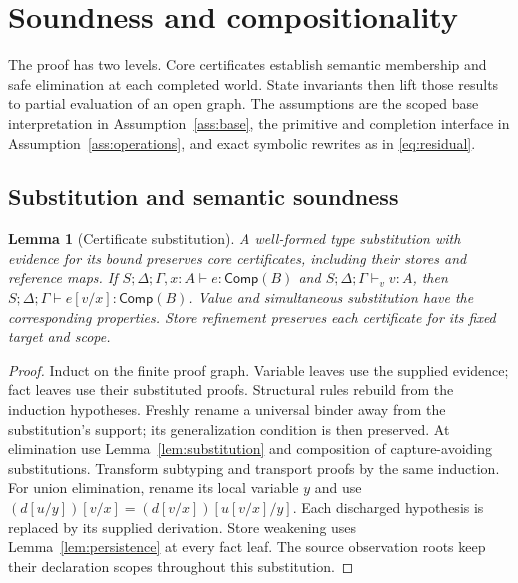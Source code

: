 \documentclass[10pt,a4paper]{article}
\newcommand{\Comp}{\mathsf{Comp}}
\newtheorem{lemma}[definition]{Lemma}
\theoremstyle{remark}
\begin{document}
\section{Soundness and compositionality}
\label{sec:metatheory}
The proof has two levels. Core certificates establish semantic membership and
safe elimination at each completed world. State invariants then lift those
results to partial evaluation of an open graph. The assumptions are the scoped
base interpretation in Assumption~\ref{ass:base}, the primitive and completion
interface in Assumption~\ref{ass:operations}, and exact symbolic rewrites as in
\eqref{eq:residual}.

\subsection{Substitution and semantic soundness}
\begin{lemma}[Certificate substitution]\label{lem:cert-subst}
A well-formed type substitution with evidence for its bound preserves core
certificates, including their stores and reference maps. If
$S;\Delta;\Gamma,x:A\vdash e:\Comp(B)$ and
$S;\Delta;\Gamma\vdash_v v:A$, then
$S;\Delta;\Gamma\vdash e[v/x]:\Comp(B)$. Value and simultaneous
substitution have the corresponding properties. Store refinement preserves
each certificate for its fixed target and scope.
\end{lemma}
\begin{proof}
Induct on the finite proof graph. Variable leaves use the supplied evidence;
fact leaves use their substituted proofs. Structural rules rebuild from the
induction hypotheses. Freshly rename a universal binder away from the
substitution's support; its generalization condition is then preserved. At
elimination use Lemma~\ref{lem:substitution} and composition of capture-avoiding
substitutions. Transform subtyping and transport proofs by the same induction.
For union elimination, rename its local variable $y$ and use
$(d[u/y])[v/x]=(d[v/x])[u[v/x]/y]$. Each discharged hypothesis is replaced
by its supplied derivation. Store weakening uses
Lemma~\ref{lem:persistence} at every fact leaf. The source observation roots
keep their declaration scopes throughout this substitution.
\end{proof}
\end{document}

